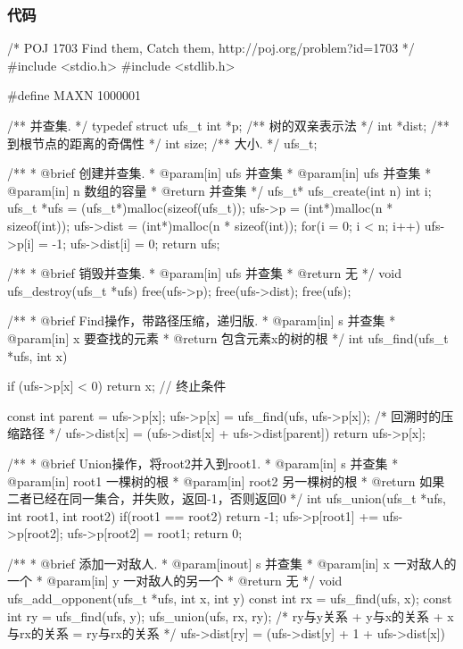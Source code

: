 \subsubsection{代码}
\begin{Codex}[label=two_gangs.c]
/* POJ 1703 Find them, Catch them, http://poj.org/problem?id=1703 */
#include <stdio.h>
#include <stdlib.h>

#define MAXN 1000001

/** 并查集. */
typedef struct ufs_t {
    int *p;     /** 树的双亲表示法 */
    int *dist;  /** 到根节点的距离的奇偶性 */
    int size;   /** 大小. */
} ufs_t;

/**
 * @brief 创建并查集.
 * @param[in] ufs 并查集
 * @param[in] ufs 并查集
 * @param[in] n 数组的容量
 * @return 并查集
 */
ufs_t* ufs_create(int n) {
    int i;
    ufs_t *ufs = (ufs_t*)malloc(sizeof(ufs_t));
    ufs->p = (int*)malloc(n * sizeof(int));
    ufs->dist = (int*)malloc(n * sizeof(int));
    for(i = 0; i < n; i++) {
        ufs->p[i] = -1;
        ufs->dist[i] = 0;
    }
    return ufs;
}

/**
 * @brief 销毁并查集.
 * @param[in] ufs 并查集
 * @return 无
 */
void ufs_destroy(ufs_t *ufs) {
    free(ufs->p);
    free(ufs->dist);
    free(ufs);
}

/**
 * @brief Find操作，带路径压缩，递归版.
 * @param[in] s 并查集
 * @param[in] x 要查找的元素
 * @return 包含元素x的树的根
 */
int ufs_find(ufs_t *ufs, int x) {
    if (ufs->p[x] < 0) return x; // 终止条件

    const int parent = ufs->p[x];
    ufs->p[x] = ufs_find(ufs, ufs->p[x]); /* 回溯时的压缩路径 */
    ufs->dist[x] = (ufs->dist[x] + ufs->dist[parent]) %
    return ufs->p[x];
}

/**
 * @brief Union操作，将root2并入到root1.
 * @param[in] s 并查集
 * @param[in] root1 一棵树的根
 * @param[in] root2 另一棵树的根
 * @return 如果二者已经在同一集合，并失败，返回-1，否则返回0
 */
int ufs_union(ufs_t *ufs, int root1, int root2) {
    if(root1 == root2) return -1;
    ufs->p[root1] += ufs->p[root2];
    ufs->p[root2] = root1;
    return 0;
}

/**
 * @brief 添加一对敌人.
 * @param[inout] s 并查集
 * @param[in] x 一对敌人的一个
 * @param[in] y 一对敌人的另一个
 * @return 无
 */
void ufs_add_opponent(ufs_t *ufs, int x, int y) {
    const int rx = ufs_find(ufs, x);
    const int ry = ufs_find(ufs, y);
    ufs_union(ufs, rx, ry);
    /* ry与y关系 + y与x的关系 + x与rx的关系 = ry与rx的关系 */
    ufs->dist[ry] = (ufs->dist[y] + 1 + ufs->dist[x]) %
}


\end{Codex}
